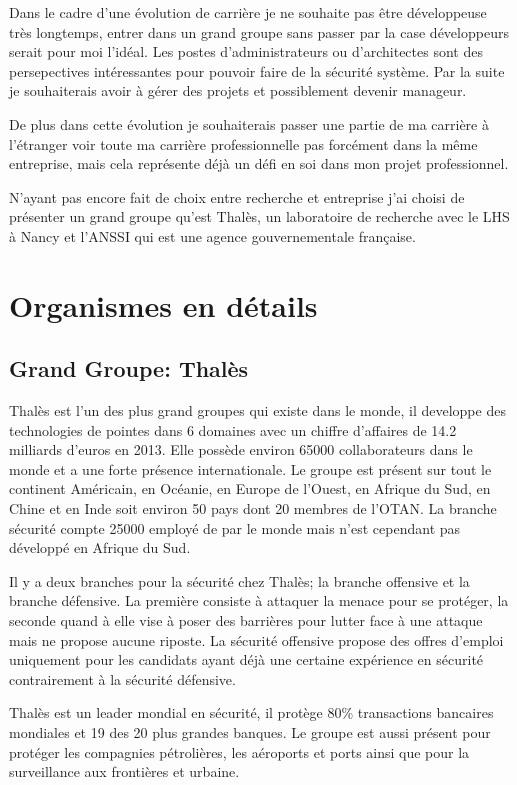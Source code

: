 \documentclass[a4paper,12pt]{article}
\begin{document}
\newpage
Dans le cadre d'une évolution de carrière je ne souhaite pas \^etre développeuse très longtemps, entrer dans un grand groupe sans passer par la case développeurs serait pour moi l'idéal. Les postes d'administrateurs ou d'architectes sont des persepectives intéressantes pour pouvoir faire de la sécurité système. Par la suite je souhaiterais avoir à gérer des projets et possiblement devenir manageur. 

De plus dans cette évolution je souhaiterais passer une partie de ma carrière à l'étranger voir toute ma carrière professionnelle pas forcément dans la m\^eme entreprise, mais cela représente déjà un défi en soi dans mon projet professionnel.

\vspace{1em}
N'ayant pas encore fait de choix entre recherche et entreprise j'ai choisi de présenter un grand groupe qu'est Thalès, un laboratoire de recherche avec le LHS à Nancy et l'ANSSI qui est une agence gouvernementale française.

\newpage
\section{Organismes en détails}
\subsection{Grand Groupe: Thalès}
Thalès est l'un des plus grand groupes qui existe dans le monde, il developpe des technologies de pointes dans 6 domaines avec un chiffre d'affaires de 14.2 milliards d'euros en 2013. Elle possède environ 65000 collaborateurs dans le monde et a une forte présence internationale. Le groupe est présent sur tout le continent Américain, en Océanie, en Europe de l'Ouest, en Afrique du Sud, en Chine et en Inde soit environ 50 pays dont 20 membres de l'OTAN. La branche sécurité compte 25000 employé de par le monde mais n'est cependant pas développé en Afrique du Sud.

Il y a deux branches pour la sécurité chez Thalès; la branche offensive et la branche défensive. La première consiste à attaquer la menace pour se protéger, la seconde quand à elle vise à poser des barrières pour lutter face à une attaque mais ne propose aucune riposte. La sécurité offensive propose des offres d'emploi uniquement pour les candidats ayant déjà une certaine expérience en sécurité contrairement à la sécurité défensive.

Thalès est un leader mondial en sécurité, il protège 80\% transactions bancaires mondiales et 19 des 20 plus grandes banques. Le groupe est aussi présent pour protéger les compagnies pétrolières, les aéroports et ports ainsi que pour la surveillance aux frontières et urbaine.
\end{document}
